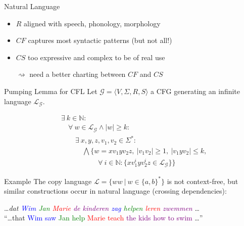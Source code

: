 \documentclass{beamer}
\begin{document}
\begin{frame}{Natural Language}
	\begin{itemize}
		\item $R$ aligned with speech, phonology, morphology
		\item $CF$ captures most syntactic patterns (but not all!)
		\item $CS$ too expressive and complex to be of real use
		\item [$\rightsquigarrow$] need a better charting between $CF$ and $CS$
	\end{itemize}
\end{frame}

\begin{frame}{Pumping Lemma for CFL}
	\small 
	Let $\mathcal{G}=\langle V, \Sigma, R, S \rangle$ a CFG generating an infinite language $\mathcal{L}_\mathcal{G}$.	
	
	\begin{align*}
		&\exists \ k \in \mathbb{N}: \\
		& \quad \forall \ w \in \mathcal{L}_\mathcal{G} \land |w| \geq k:\\
		& \quad \quad \exists \ x,y,z,v_1,v_2 \in \Sigma^*:\\
		& \quad \quad \quad \bigwedge \Big\{  w = xv_1yv_2z, \ |v_1v_2|\geq 1, \ |v_1yv_2| \leq k,\\
		& \quad \quad \quad \quad \quad \ \forall \ i \in \mathbb{N}: \{ xv_1^iyv_2^iz \in \mathcal{L}_\mathcal{G} \}\Big\}
	\end{align*}
	\pause
	
	\begin{block}{Example}
	The copy language $\mathcal{L} = \{ww \ | \ w \in \{a,b\}^*\}$ is \alert{not} context-free, but similar constructions occur
	in natural language (crossing dependencies):
	\begin{center}
		\dots \textit{dat \textcolor{blue}{Wim} \textcolor{green}{Jan} \textcolor{red}{Marie} \textcolor{purple}{de kinderen}
		\textcolor{blue}{zag} \textcolor{green}{helpen} \textcolor{red}{leren} \textcolor{purple}{zwemmen}} \dots\\
		``\dots that \textcolor{blue}{Wim saw} \textcolor{green}{Jan help} \textcolor{red}{Marie teach} \textcolor{purple}{the kids how to swim} \dots''
	\end{center}
	\end{block}
\end{frame}
\end{document}
